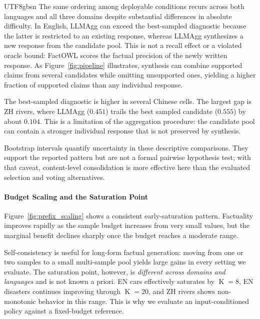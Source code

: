 \documentclass[11pt]{article}
\begin{document}
\begin{CJK*}{UTF8}{gbsn}
The same ordering among deployable conditions recurs across both languages and all three domains despite substantial differences in absolute difficulty. In English, LLMAgg can exceed the best-sampled diagnostic because the latter is restricted to an existing response, whereas LLMAgg synthesizes a new response from the candidate pool. This is not a recall effect or a violated oracle bound: FactOWL scores the factual precision of the newly written response. As Figure~\ref{fig:pipeline} illustrates, synthesis can combine supported claims from several candidates while omitting unsupported ones, yielding a higher fraction of supported claims than any individual response.

The best-sampled diagnostic is higher in several Chinese cells. The largest gap is ZH rivers, where LLMAgg ($0.451$) trails the best sampled candidate ($0.555$) by about $0.104$. This is a limitation of the aggregation procedure: the candidate pool can contain a stronger individual response that is not preserved by synthesis.

Bootstrap intervals quantify uncertainty in these descriptive comparisons. They support the reported pattern but are not a formal pairwise hypothesis test; with that caveat, content-level consolidation is more effective here than the evaluated selection and voting alternatives.

\paragraph{Budget Scaling and the Saturation Point}

Figure~\ref{fig:prefix_scaling} shows a consistent early-saturation pattern. Factuality improves rapidly as the sample budget increases from very small values, but the marginal benefit declines sharply once the budget reaches a moderate range.

Self-consistency is useful for long-form factual generation: moving from one or two samples to a small multi-sample pool yields large gains in every setting we evaluate. The saturation point, however, is \emph{different across domains and languages} and is not known a priori. EN cars effectively saturates by $\operatorname{K}\!=\!8$, EN disasters continues improving through $\operatorname{K}\!=\!20$, and ZH rivers shows non-monotonic behavior in this range. This is why we evaluate an input-conditioned policy against a fixed-budget reference.




\end{CJK*}
\end{document}
